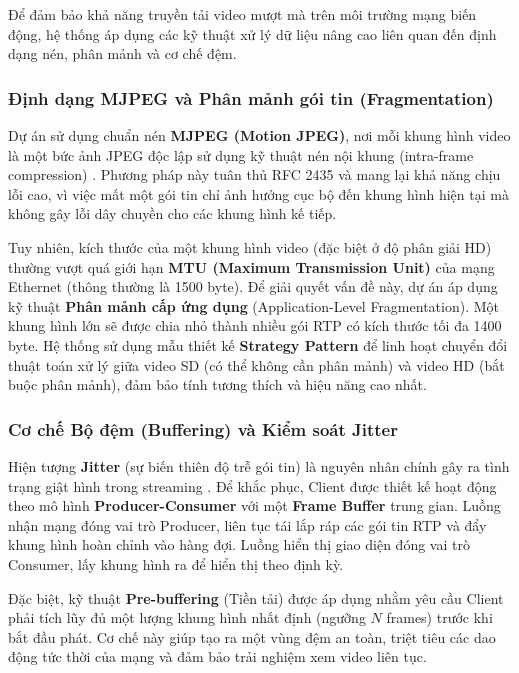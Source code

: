 Để đảm bảo khả năng truyền tải video mượt mà trên môi trường mạng biến động, hệ thống áp dụng các kỹ thuật xử lý dữ liệu nâng cao liên quan đến định dạng nén, phân mảnh và cơ chế đệm.

\subsubsection{Định dạng MJPEG và Phân mảnh gói tin (Fragmentation)}
Dự án sử dụng chuẩn nén \textbf{MJPEG (Motion JPEG)}, nơi mỗi khung hình video là một bức ảnh JPEG độc lập sử dụng kỹ thuật nén nội khung (intra-frame compression) \cite{tekalp2015digital}. Phương pháp này tuân thủ RFC 2435 \cite{rfc2435} và mang lại khả năng chịu lỗi cao, vì việc mất một gói tin chỉ ảnh hưởng cục bộ đến khung hình hiện tại mà không gây lỗi dây chuyền cho các khung hình kế tiếp.

Tuy nhiên, kích thước của một khung hình video (đặc biệt ở độ phân giải HD) thường vượt quá giới hạn \textbf{MTU (Maximum Transmission Unit)} của mạng Ethernet (thông thường là 1500 byte). Để giải quyết vấn đề này, dự án áp dụng kỹ thuật \textbf{Phân mảnh cấp ứng dụng} (Application-Level Fragmentation). Một khung hình lớn sẽ được chia nhỏ thành nhiều gói RTP có kích thước tối đa 1400 byte. Hệ thống sử dụng mẫu thiết kế \textbf{Strategy Pattern} \cite{gamma1994design} để linh hoạt chuyển đổi thuật toán xử lý giữa video SD (có thể không cần phân mảnh) và video HD (bắt buộc phân mảnh), đảm bảo tính tương thích và hiệu năng cao nhất.

\subsubsection{Cơ chế Bộ đệm (Buffering) và Kiểm soát Jitter}
Hiện tượng \textbf{Jitter} (sự biến thiên độ trễ gói tin) là nguyên nhân chính gây ra tình trạng giật hình trong streaming \cite{kurose2021computer}. Để khắc phục, Client được thiết kế hoạt động theo mô hình \textbf{Producer-Consumer} với một \textbf{Frame Buffer} trung gian. Luồng nhận mạng đóng vai trò Producer, liên tục tái lắp ráp các gói tin RTP và đẩy khung hình hoàn chỉnh vào hàng đợi. Luồng hiển thị giao diện đóng vai trò Consumer, lấy khung hình ra để hiển thị theo định kỳ.

Đặc biệt, kỹ thuật \textbf{Pre-buffering} (Tiền tải) được áp dụng nhằm yêu cầu Client phải tích lũy đủ một lượng khung hình nhất định (ngưỡng $N$ frames) trước khi bắt đầu phát. Cơ chế này giúp tạo ra một vùng đệm an toàn, triệt tiêu các dao động tức thời của mạng và đảm bảo trải nghiệm xem video liên tục.

